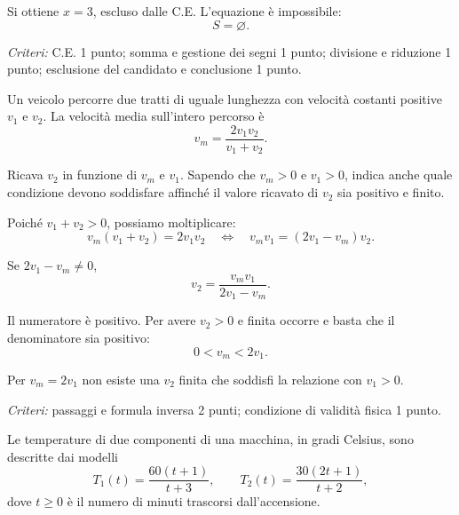 \documentclass[11pt,a4paper,addpoints]{exam}
\newcommand{\obiettivocorrente}{}
\newcommand{\obiettivo}[1]{%
  \gdef\obiettivocorrente{#1}%
}
\gdef\obiettivocorrente{}%
\newcounter{offsetfila}
\newenvironment{esercizi}
  {%
    \begin{questions}
    \setcounter{question}{\value{offsetfila}}%
  }
  {\end{questions}}
\newenvironment{esercizio}
  {%
    \par
    \ifprintanswers\else\begin{samepage}\fi
  }
  {%
    \ifprintanswers\else\end{samepage}\fi
    \par\vspace{3pt}
  }
\begin{document}
\begin{esercizi}
\begin{esercizio}
\begin{parts}
\begin{solution}
    Si ottiene $x=3$, escluso dalle C.E.
    L'equazione è impossibile:
    \[
      \boxed{S=\varnothing}.
    \]

    \textit{Criteri:} C.E. 1 punto;
    somma e gestione dei segni 1 punto;
    divisione e riduzione 1 punto;
    esclusione del candidato e conclusione 1 punto.
  \end{solution}
\end{parts}
\end{esercizio}

\begin{esercizio}
\obiettivo{ricavare una formula inversa}
\question[3]

Un veicolo percorre due tratti di uguale lunghezza
con velocità costanti positive $v_1$ e $v_2$.
La velocità media sull'intero percorso è
\[
  v_m=\frac{2v_1v_2}{v_1+v_2}.
\]

Ricava $v_2$ in funzione di $v_m$ e $v_1$.
Sapendo che $v_m>0$ e $v_1>0$, indica anche
quale condizione devono soddisfare affinché
il valore ricavato di $v_2$ sia positivo e finito.

\begin{solution}
  Poiché $v_1+v_2>0$, possiamo moltiplicare:
  \[
    v_m(v_1+v_2)=2v_1v_2
    \quad\Longleftrightarrow\quad
    v_mv_1=(2v_1-v_m)v_2.
  \]

  Se $2v_1-v_m\ne0$,
  \[
    \boxed{v_2=\frac{v_mv_1}{2v_1-v_m}}.
  \]

  Il numeratore è positivo. Per avere $v_2>0$ e finita
  occorre e basta che il denominatore sia positivo:
  \[
    \boxed{0<v_m<2v_1}.
  \]

  Per $v_m=2v_1$ non esiste una $v_2$ finita
  che soddisfi la relazione con $v_1>0$.

  \textit{Criteri:} passaggi e formula inversa 2 punti;
  condizione di validità fisica 1 punto.
\end{solution}
\end{esercizio}

\begin{esercizio}
\obiettivo{interpretare e confrontare modelli frazionari}
\question

Le temperature di due componenti di una macchina,
in gradi Celsius, sono descritte dai modelli
\[
  T_1(t)=\frac{60(t+1)}{t+3},
  \qquad
  T_2(t)=\frac{30(2t+1)}{t+2},
\]
dove $t\ge0$ è il numero di minuti trascorsi dall'accensione.

\begin{parts}

\end{parts}
\end{esercizio}
\end{esercizi}
\end{document}
